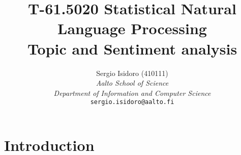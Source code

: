 \documentclass[a4paper,10pt]{article}
\title{T-61.5020 Statistical Natural Language Processing  \\ Topic and Sentiment analysis}
\author{Sergio Isidoro (410111)\\
	   \textit{Aalto School of Science} \\ \textit{Department of Information and Computer Science}\\ 	   
       {\tt sergio.isidoro@aalto.fi}}
\begin{document}
\maketitle

\section{Introduction}
\end{document}

